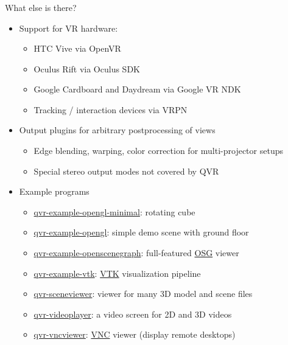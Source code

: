 \documentclass[utf8,stillsansserifmath,fleqn,t]{beamer}
\begin{document}
\begin{frame}
\frametitle{\insertsection}
What else is there?
\begin{itemize}
\item Support for VR hardware:
    \begin{itemize}
    \item HTC Vive via OpenVR
    \item Oculus Rift via Oculus SDK
    \item Google Cardboard and Daydream via Google VR NDK
    \item Tracking / interaction devices via VRPN
    \end{itemize}
\item Output plugins for arbitrary postprocessing of views
    \begin{itemize}
    \item Edge blending, warping, color correction for multi-projector setups
    \item Special stereo output modes not covered by QVR
    \end{itemize}
\item Example programs
    \begin{itemize}
    \item \href{https://git.marlam.de/gitweb/?p=qvr.git;a=tree;hb=HEAD;f=qvr-example-opengl-minimal}{qvr-example-opengl-minimal}: rotating cube
    \item \href{https://git.marlam.de/gitweb/?p=qvr.git;a=tree;hb=HEAD;f=qvr-example-opengl}{qvr-example-opengl}: simple demo scene with ground floor
    \item \href{https://git.marlam.de/gitweb/?p=qvr.git;a=tree;hb=HEAD;f=qvr-example-openscenegraph}{qvr-example-openscenegraph}: full-featured \href{http://www.openscenegraph.com/}{OSG} viewer
    \item \href{https://git.marlam.de/gitweb/?p=qvr.git;a=tree;hb=HEAD;f=qvr-example-vtk}{qvr-example-vtk}: \href{http://www.vtk.org/}{VTK} visualization pipeline
    \item \href{https://git.marlam.de/gitweb/?p=qvr.git;a=tree;hb=HEAD;f=qvr-sceneviewer}{qvr-sceneviewer}: viewer for many 3D model and scene files
    \item \href{https://git.marlam.de/gitweb/?p=qvr.git;a=tree;hb=HEAD;f=qvr-videoplayer}{qvr-videoplayer}: a video screen for 2D and 3D videos
    \item \href{https://git.marlam.de/gitweb/?p=qvr.git;a=tree;hb=HEAD;f=qvr-vncviewer}{qvr-vncviewer}: \href{https://en.wikipedia.org/wiki/Virtual_Network_Computing}{VNC} viewer (display remote desktops)
    \end{itemize}
\end{itemize}
\end{frame}
\end{document}
